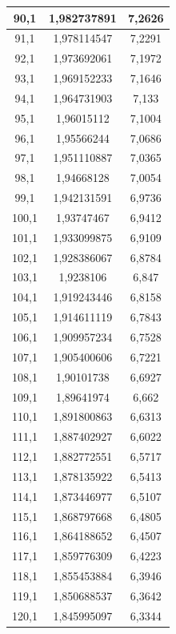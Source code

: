 \documentclass[a4paper,12pt]{article}
\begin{document}
\begin{longtable}{|c|c|c|}
        90,1 & 1,982737891 & 7,2626 \\ \hline
        91,1 & 1,978114547 & 7,2291 \\ \hline
        92,1 & 1,973692061 & 7,1972 \\ \hline
        93,1 & 1,969152233 & 7,1646 \\ \hline
        94,1 & 1,964731903 & 7,133 \\ \hline
        95,1 & 1,96015112 & 7,1004 \\ \hline
        96,1 & 1,95566244 & 7,0686 \\ \hline
        97,1 & 1,951110887 & 7,0365 \\ \hline
        98,1 & 1,94668128 & 7,0054 \\ \hline
        99,1 & 1,942131591 & 6,9736 \\ \hline
        100,1 & 1,93747467 & 6,9412 \\ \hline
        101,1 & 1,933099875 & 6,9109 \\ \hline
        102,1 & 1,928386067 & 6,8784 \\ \hline
        103,1 & 1,9238106 & 6,847 \\ \hline
        104,1 & 1,919243446 & 6,8158 \\ \hline
        105,1 & 1,914611119 & 6,7843 \\ \hline
        106,1 & 1,909957234 & 6,7528 \\ \hline
        107,1 & 1,905400606 & 6,7221 \\ \hline
        108,1 & 1,90101738 & 6,6927 \\ \hline
        109,1 & 1,89641974 & 6,662 \\ \hline
        110,1 & 1,891800863 & 6,6313 \\ \hline
        111,1 & 1,887402927 & 6,6022 \\ \hline
        112,1 & 1,882772551 & 6,5717 \\ \hline
        113,1 & 1,878135922 & 6,5413 \\ \hline
        114,1 & 1,873446977 & 6,5107 \\ \hline
        115,1 & 1,868797668 & 6,4805 \\ \hline
        116,1 & 1,864188652 & 6,4507 \\ \hline
        117,1 & 1,859776309 & 6,4223 \\ \hline
        118,1 & 1,855453884 & 6,3946 \\ \hline
        119,1 & 1,850688537 & 6,3642 \\ \hline
        120,1 & 1,845995097 & 6,3344 \\ \hline

\end{longtable}
\end{document}
